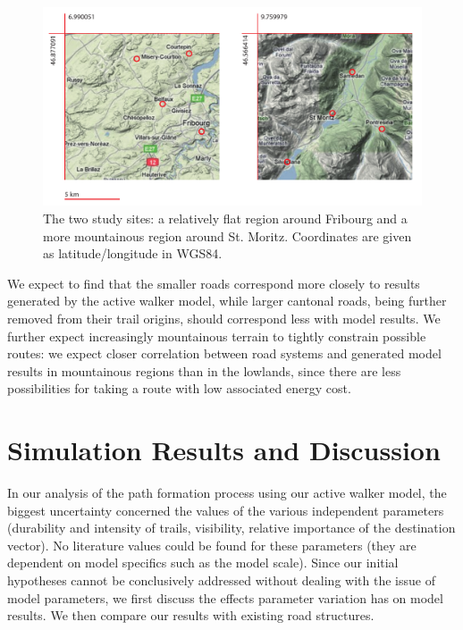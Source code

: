 \documentclass[a4paper, DIV11, abstracton]{scrartcl}
\begin{document}
\begin{figure}[tbp]
	\includegraphics[width=\linewidth]{../figures/site}
	\caption{The two study sites: a relatively flat region around Fribourg and a more mountainous region around St. Moritz. Coordinates are given as latitude/longitude in WGS84.}
	\label{fig:site}
\end{figure}

We expect to find that the smaller roads correspond more closely to results generated by the active walker model, while larger cantonal roads, being further removed from their trail origins, should correspond less with model results. We further expect increasingly mountainous terrain to tightly constrain possible routes: we expect closer correlation between road systems and generated model results in mountainous regions than in the lowlands, since there are less possibilities for taking a route with low associated energy cost.






\section{Simulation Results and Discussion}
In our analysis of the path formation process using our active walker model, the biggest uncertainty concerned the values of the various independent parameters (durability and intensity of trails, visibility, relative importance of the destination vector). No literature values could be found for these parameters (they are dependent on model specifics such as the model scale). Since our initial hypotheses cannot be conclusively addressed without dealing with the issue of model parameters, we first discuss the effects parameter variation has on model results. We then compare our results with existing road structures.
\end{document}
